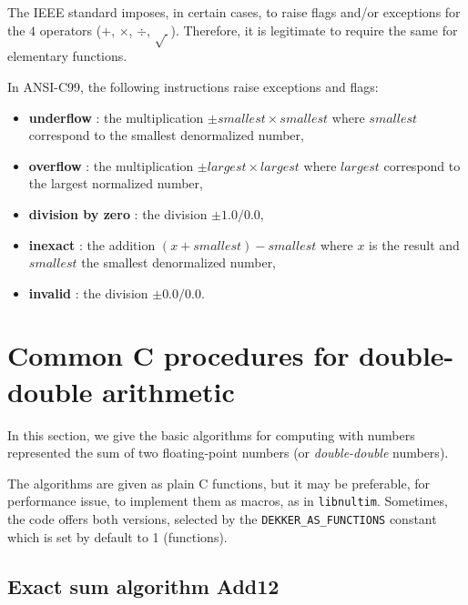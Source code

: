 The IEEE standard imposes, in certain cases, to raise flags and/or
exceptions for the $4$ operators ($+$, $\times$, $\div$, $\sqrt{~}$).
Therefore, it is legitimate to require the same for elementary
functions.

In ANSI-C99, the following instructions raise exceptions and
flags:

\begin{itemize}
\item {\bf underflow} : the multiplication $\pm smallest \times smallest$ where $smallest$ correspond to the smallest denormalized number,
\item {\bf overflow} : the multiplication  $\pm largest \times largest$ where $largest$ correspond to the largest normalized number,
\item {\bf division by zero} : the division $\pm 1.0/0.0$,
\item {\bf inexact} : the addition $(x + smallest) - smallest$ where $x$ is the result and  $smallest$ the smallest denormalized number,
\item {\bf invalid} : the division $\pm 0.0/0.0$.
\end{itemize}








\section{Common C procedures for double-double arithmetic\label{section:commonCdoubledouble}}

In this section, we give the basic algorithms for computing with
numbers represented the sum of two floating-point numbers (or
\emph{double-double} numbers). 

The algorithms are given as plain C functions, but it may be
preferable, for performance issue, to implement them as macros, as in
\texttt{libnultim}.  Sometimes, the code offers both versions,
selected by the \texttt{DEKKER\_AS\_FUNCTIONS} constant which is set
by default to 1 (functions).


\subsection{Exact sum algorithm {Add12}}

